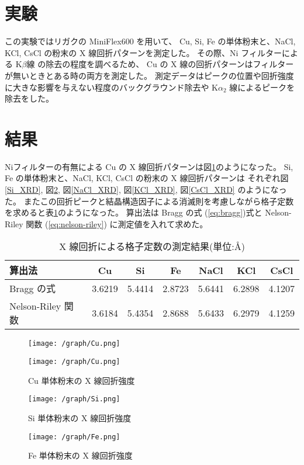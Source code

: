 \documentclass[11pt,dvipdfmx,a4paper]{jsarticle}
\begin{document}
\section{実験}
この実験ではリガクの MiniFlex600 を用いて、
Cu, Si, Fe の単体粉末と、NaCl, KCl, CsCl の粉末の X 線回折パターンを測定した。
その際、Ni フィルターによる K\(\beta\)線 の除去の程度を調べるため、
Cu の X 線の回折パターンはフィルターが無いときとある時の両方を測定した。
測定データはピークの位置や回折強度に大きな影響を与えない程度のバックグラウンド除去や
K\(\alpha_2\) 線によるピークを除去をした。

\section{結果}
Niフィルターの有無による Cu の X 線回折パターンは図\ref{Cu_XRD}のようになった。
Si, Fe の単体粉末と、NaCl, KCl, CsCl の粉末の X 線回折パターンは
それぞれ図\ref{Si_XRD}, 図\ref{Fe_XRD}, 図\ref{NaCl_XRD}, 図\ref{KCl_XRD}, 図\ref{CsCl_XRD} のようになった。
またこの回折ピークと結晶構造因子による消滅則を考慮しながら格子定数を求めると表\ref{table:result}のようになった。
算出法は Bragg の式 (\ref{eq:bragg})式と Nelson-Riley 関数 (\ref{eq:nelson-riley}) に測定値を入れて求めた。
\begin{table}[H]
	\centering
	\caption{X 線回折による格子定数の測定結果(単位:\AA)} \label{table:result}
	\begin{tabular}[pos]{lcccccc}
		\hline \hline
		算出法 & Cu & Si & Fe & NaCl & KCl & CsCl \\
		\hline
		Bragg の式 & 3.6219 & 5.4414 & 2.8723 & 5.6441 & 6.2898 & 4.1207 \\
		Nelson-Riley 関数 & 3.6184 & 5.4354 & 2.8688 & 5.6433 & 6.2979 & 4.1259\\
		\hline \hline
	\end{tabular}
\end{table}
\begin{figure}[H]
	\centering
	\begin{minipage}[t]{0.48\columnwidth}
		\centering
		\texttt{[image: /graph/Cu.png]}
	\end{minipage}
	\hfil
	\begin{minipage}[t]{0.48\columnwidth}
		\centering
		\texttt{[image: /graph/Cu.png]}
	\end{minipage}
	\caption{Cu 単体粉末の X 線回折強度}
	\label{Cu_XRD}
\end{figure}
\begin{figure}[H]
	\centering
	\begin{minipage}[t]{0.48\columnwidth}
		\centering
		\texttt{[image: /graph/Si.png]}
		\caption{Si 単体粉末の X 線回折強度}
		\label{Si_XRD}
	\end{minipage}
	\hfil
	\begin{minipage}[t]{0.48\columnwidth}
		\centering
		\texttt{[image: /graph/Fe.png]}
		\caption{Fe 単体粉末の X 線回折強度}
		\label{Fe_XRD}
	\end{minipage}
\end{figure}
\end{document}
